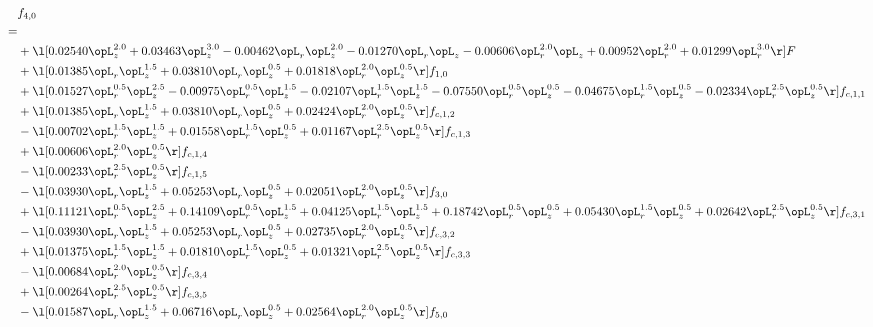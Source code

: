\begin{alignat}{2} 
\label{eq:f_40_1} 
& f_{4,0} \nonumber \\ 
 = \\ 
& + \l[  0.02540 \opL_z^{2.0} +  0.03463 \opL_z^{3.0}   -0.00462 \opL_r \opL_z^{2.0}   -0.01270 \opL_r \opL_z   -0.00606 \opL_r^{2.0} \opL_z +  0.00952 \opL_r^{2.0} +  0.01299 \opL_r^{3.0}  \r] F \nonumber \\ 
& + \l[  0.01385 \opL_r \opL_z^{1.5} +  0.03810 \opL_r \opL_z^{0.5} +  0.01818 \opL_r^{2.0} \opL_z^{0.5}  \r] f_{1,0} \nonumber \\ 
& + \l[  0.01527 \opL_r^{0.5} \opL_z^{2.5}   -0.00975 \opL_r^{0.5} \opL_z^{1.5}   -0.02107 \opL_r^{1.5} \opL_z^{1.5}   -0.07550 \opL_r^{0.5} \opL_z^{0.5}   -0.04675 \opL_r^{1.5} \opL_z^{0.5}   -0.02334 \opL_r^{2.5} \opL_z^{0.5}  \r] f_{c,1,1} \nonumber \\ 
& + \l[  0.01385 \opL_r \opL_z^{1.5} +  0.03810 \opL_r \opL_z^{0.5} +  0.02424 \opL_r^{2.0} \opL_z^{0.5}  \r] f_{c,1,2} \nonumber \\ 
& - \l[  0.00702 \opL_r^{1.5} \opL_z^{1.5} +  0.01558 \opL_r^{1.5} \opL_z^{0.5} +  0.01167 \opL_r^{2.5} \opL_z^{0.5}  \r] f_{c,1,3} \nonumber \\ 
& + \l[  0.00606 \opL_r^{2.0} \opL_z^{0.5}  \r] f_{c,1,4} \nonumber \\ 
& - \l[  0.00233 \opL_r^{2.5} \opL_z^{0.5}  \r] f_{c,1,5} \nonumber \\ 
& - \l[  0.03930 \opL_r \opL_z^{1.5} +  0.05253 \opL_r \opL_z^{0.5} +  0.02051 \opL_r^{2.0} \opL_z^{0.5}  \r] f_{3,0} \nonumber \\ 
& + \l[  0.11121 \opL_r^{0.5} \opL_z^{2.5} +  0.14109 \opL_r^{0.5} \opL_z^{1.5} +  0.04125 \opL_r^{1.5} \opL_z^{1.5} +  0.18742 \opL_r^{0.5} \opL_z^{0.5} +  0.05430 \opL_r^{1.5} \opL_z^{0.5} +  0.02642 \opL_r^{2.5} \opL_z^{0.5}  \r] f_{c,3,1} \nonumber \\ 
& - \l[  0.03930 \opL_r \opL_z^{1.5} +  0.05253 \opL_r \opL_z^{0.5} +  0.02735 \opL_r^{2.0} \opL_z^{0.5}  \r] f_{c,3,2} \nonumber \\ 
& + \l[  0.01375 \opL_r^{1.5} \opL_z^{1.5} +  0.01810 \opL_r^{1.5} \opL_z^{0.5} +  0.01321 \opL_r^{2.5} \opL_z^{0.5}  \r] f_{c,3,3} \nonumber \\ 
& - \l[  0.00684 \opL_r^{2.0} \opL_z^{0.5}  \r] f_{c,3,4} \nonumber \\ 
& + \l[  0.00264 \opL_r^{2.5} \opL_z^{0.5}  \r] f_{c,3,5} \nonumber \\ 
& - \l[  0.01587 \opL_r \opL_z^{1.5} +  0.06716 \opL_r \opL_z^{0.5} +  0.02564 \opL_r^{2.0} \opL_z^{0.5}  \r] f_{5,0} \nonumber \\ 

\end{alignat}
